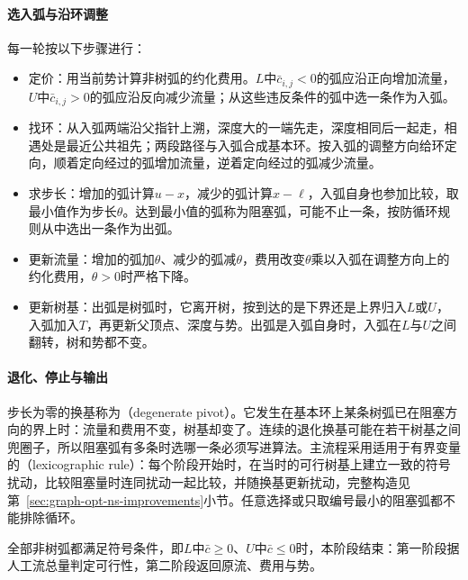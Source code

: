 \paragraph{选入弧与沿环调整}
每一轮按以下步骤进行：
\begin{itemize}
  \item 定价：用当前势计算非树弧的约化费用。$L$中$\bar c_{i,j}<0$的弧应沿正向增加流量，$U$中$\bar c_{i,j}>0$的弧应沿反向减少流量；从这些违反条件的弧中选一条作为入弧。
  \item 找环：从入弧两端沿父指针上溯，深度大的一端先走，深度相同后一起走，相遇处是最近公共祖先；两段路径与入弧合成基本环。按入弧的调整方向给环定向，顺着定向经过的弧增加流量，逆着定向经过的弧减少流量。
  \item 求步长：增加的弧计算$u-x$，减少的弧计算$x-\ell$，入弧自身也参加比较，取最小值作为步长$\theta$。达到最小值的弧称为阻塞弧，可能不止一条，按防循环规则从中选出一条作为出弧。
  \item 更新流量：增加的弧加$\theta$、减少的弧减$\theta$，费用改变$\theta$乘以入弧在调整方向上的约化费用，$\theta>0$时严格下降。
  \item 更新树基：出弧是树弧时，它离开树，按到达的是下界还是上界归入$L$或$U$，入弧加入$T$，再更新父顶点、深度与势。出弧是入弧自身时，入弧在$L$与$U$之间翻转，树和势都不变。
\end{itemize}

\paragraph{退化、停止与输出}
步长为零的换基称为（degenerate pivot）。它发生在基本环上某条树弧已在阻塞方向的界上时：流量和费用不变，树基却变了。连续的退化换基可能在若干树基之间兜圈子，所以阻塞弧有多条时选哪一条必须写进算法。主流程采用适用于有界变量的（lexicographic rule）：每个阶段开始时，在当时的可行树基上建立一致的符号扰动，比较阻塞量时连同扰动一起比较，并随换基更新扰动，完整构造见第~\ref{sec:graph-opt-ns-improvements}小节。任意选择或只取编号最小的阻塞弧都不能排除循环。

全部非树弧都满足符号条件，即$L$中$\bar c\geq0$、$U$中$\bar c\leq0$时，本阶段结束：第一阶段据人工流总量判定可行性，第二阶段返回原流、费用与势。

